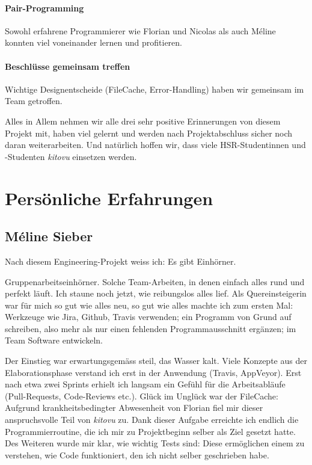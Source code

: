 \documentclass[a4paper]{article}
\let\oldsection\section
\renewcommand\section{\clearpage\oldsection}
\begin{document}
\paragraph{Pair-Programming}
 Sowohl erfahrene Programmierer wie Florian und Nicolas als auch Méline konnten viel voneinander lernen und profitieren.
\paragraph{Beschlüsse gemeinsam treffen}
 Wichtige Designentscheide (FileCache, Error-Handling) haben wir gemeinsam im Team getroffen.

Alles in Allem nehmen wir alle drei sehr positive Erinnerungen von diesem Projekt mit, haben viel gelernt und werden nach Projektabschluss sicher noch daran weiterarbeiten. Und natürlich hoffen wir, dass viele HSR-Studentinnen und -Studenten \emph{kitovu} einsetzen werden.

  \section{Persönliche Erfahrungen}

  \subsection{Méline Sieber}

Nach diesem Engineering-Projekt weiss ich: Es gibt Einhörner.

Gruppenarbeitseinhörner. Solche Team-Arbeiten, in denen einfach alles rund und perfekt läuft. Ich staune noch jetzt, wie reibungslos alles lief. Als Quereinsteigerin war für mich so gut wie alles neu, so gut wie alles machte ich zum ersten Mal: Werkzeuge wie Jira, Github, Travis verwenden; ein Programm von Grund auf schreiben, also mehr als nur einen fehlenden Programmausschnitt ergänzen; im Team Software entwickeln.

Der Einstieg war erwartungsgemäss steil, das Wasser kalt. Viele Konzepte aus der Elaborationsphase verstand ich erst in der Anwendung (Travis, AppVeyor). Erst nach etwa zwei Sprints erhielt ich langsam ein Gefühl für die Arbeitsabläufe (Pull-Requests, Code-Reviews etc.). Glück im Unglück war der FileCache: Aufgrund krankheitsbedingter Abwesenheit von Florian fiel mir dieser anspruchsvolle Teil von \emph{kitovu} zu. 
Dank dieser Aufgabe erreichte ich endlich die Programmierroutine, die ich mir zu Projektbeginn selber als Ziel gesetzt hatte. Des Weiteren wurde mir klar, wie wichtig Tests sind: Diese ermöglichen einem zu verstehen, wie Code funktioniert, den ich nicht selber geschrieben habe.
\end{document}
